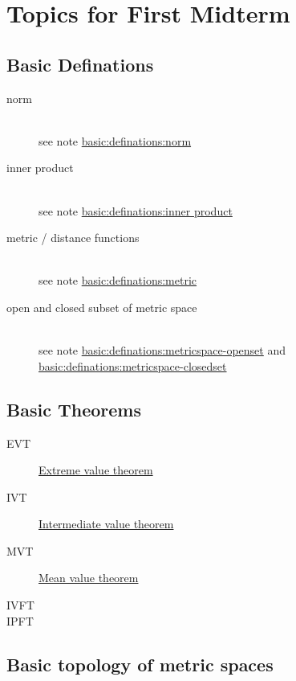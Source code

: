 \section{Topics for First Midterm}


\subsection{Basic Definations}

\begin{description}
\item[norm]\hfill\\
	see note \hyperref[def:norm]{basic:definations:norm}
\item[inner product]\hfill\\
	see note \hyperref[def:innerprod]{basic:definations:inner product}
\item[metric / distance functions]\hfill\\
	see note \hyperref[def:metric]{basic:definations:metric}
\item[open and closed subset of metric space]\hfill\\
	see note \hyperref[def:metric]{basic:definations:metricspace-openset}
		and \hyperref[def:metric]{basic:definations:metricspace-closedset}
\end{description}

\subsection{Basic Theorems}
\begin{description}
\item[EVT] \hyperref[thm:evt]{Extreme value theorem}
\item[IVT] \hyperref[thm:ivt]{Intermediate value theorem}
\item[MVT] \hyperref[thm:mvt]{Mean value theorem}
\item[IVFT] 
\item[IPFT] 
\end{description}

\subsection{Basic topology of metric spaces}

